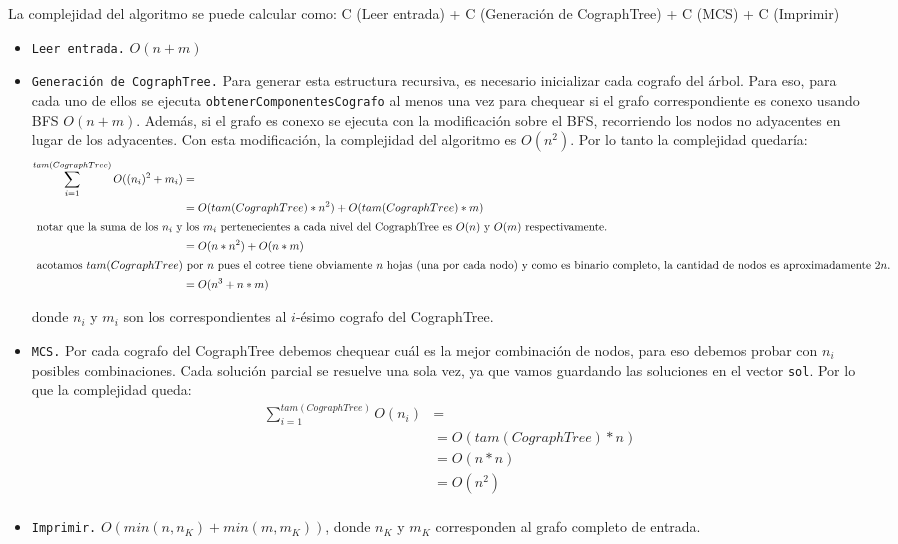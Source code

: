 La complejidad del algoritmo se puede calcular como:
C (Leer entrada) + C (Generación de CographTree) + C (MCS) + C (Imprimir)

\begin{itemize}
\item \texttt{Leer entrada.} $ O (n + m) $ 
\item \texttt{Generación de CographTree.} Para generar esta estructura recursiva, es necesario inicializar cada cografo del árbol. 
Para eso, para cada uno de ellos se ejecuta \hfill \break
\texttt{obtenerComponentesCografo} al menos una vez para chequear si el grafo correspondiente es conexo usando BFS $O(n+m)$.
Además, si el grafo es conexo se ejecuta con la modificación sobre el BFS, recorriendo los nodos no adyacentes en lugar de los adyacentes. Con esta modificación, la complejidad del algoritmo es $O(n^2)$.
Por lo tanto la complejidad quedaría:
\begin{align*}
\sum_{i=1}^{tam(CographTree)} O ( (n_i)^2 + m_i ) & = \\
& = O ( tam(CographTree) * n^2 ) +  O ( tam(CographTree) * m ) \\
\intertext{ notar que la suma de los $n_i$ y los $m_i$ pertenecientes a cada nivel del CographTree es $O(n)$ y $O(m)$ respectivamente.}
& = O ( n * n^2 ) +  O ( n * m ) \\
\intertext{ acotamos $tam(CographTree)$ por $n$ pues el cotree tiene obviamente $n$ hojas (una por cada nodo) y como es binario completo, la cantidad de nodos es aproximadamente $2n$.}
& = O ( n^3 + n*m )
\end{align*}

donde $n_i$ y $m_i$ son los correspondientes al $i$-ésimo cografo del CographTree.

\item \texttt{MCS.} Por cada cografo del CographTree debemos chequear cuál es la mejor combinación de nodos, para eso debemos probar con $n_i$ posibles combinaciones. Cada solución parcial se resuelve una sola vez, ya que vamos guardando las soluciones en el vector \texttt{sol}. Por lo que la complejidad queda:
\begin{align*}
\sum_{i=1}^{tam(CographTree)} O (n_i) & = \\
& = O ( tam(CographTree) * n ) \\
& = O ( n * n ) \\
& = O ( n^2 ) \\
\end{align*}

\item \texttt{Imprimir.} $O( min( n, n_K) + min (m, m_K) )$, donde $n_K$ y $m_K$ corresponden al grafo completo de entrada.
\end{itemize}

